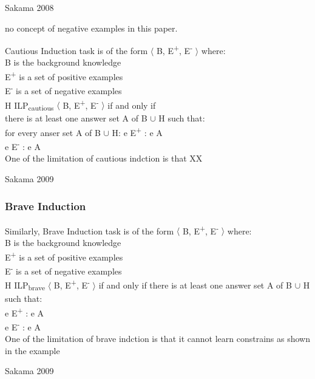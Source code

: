 \documentclass[12pt,twoside]{report}
\begin{document}
Sakama 2008

no concept of negative examples in this paper.

Cautious Induction task is of the form $\langle$ B, E\textsuperscript{+}, E\textsuperscript{-} $\rangle$ where: \\
B is the background knowledge \\
E\textsuperscript{+} is a set of positive examples \\
E\textsuperscript{-} is a set of negative examples \\

 H \in ILP\textsubscript{cautious} $\langle$ B, E\textsuperscript{+}, E\textsuperscript{-} $\rangle$ if and only if  \\

 there is at least one answer set A of B $\cup$ H such that: \\
 for every anser set A of B $\cup$ H:
\forall e \in E\textsuperscript{+} : e \in A \\
\forall e \in E\textsuperscript{-} : e \notin A \\

One of the limitation of cautious indction is that XX

Sakama 2009


\subsubsection{Brave Induction}

Similarly, Brave Induction task is of the form $\langle$ B, E\textsuperscript{+}, E\textsuperscript{-} $\rangle$ where: \\
B is the background knowledge \\
E\textsuperscript{+} is a set of positive examples \\
E\textsuperscript{-} is a set of negative examples \\

 H \in ILP\textsubscript{brave} $\langle$ B, E\textsuperscript{+}, E\textsuperscript{-} $\rangle$ if and only if there is at least one answer set A of B $\cup$ H such that: \\
\forall e \in E\textsuperscript{+} : e \in A \\
\forall e \in E\textsuperscript{-} : e \notin A \\

One of the limitation of brave indction is that it cannot learn constrains as shown in the example

Sakama 2009
\end{document}
